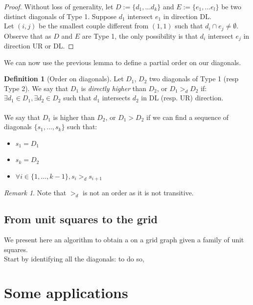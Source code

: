\documentclass[12pt]{article}
\theoremstyle{definition}
\newtheorem{definition}{Definition}[section]
\theoremstyle{remark}
\newtheorem*{remark}{Remark}
\begin{document}
\begin{proof}
    Without loss of generality, let $D:=\{d_1, ... d_k\}$ and $E:= \{e_1, ... e_l\}$ be two distinct diagonals of Type 1. 
    Suppose $d_1$ intersect $e_1$ in direction DL. \\
    Let $(i,j)$ be the smallest couple different from $(1,1)$ such that $d_i \cap e_j \ne \emptyset$. Observe that as $D$ and $E$ are Type 1, the only possibility is that 
    $d_i$ intersect $e_j$ in direction UR or DL.
\end{proof}

We can now use the previous lemma to define a partial order on our diagonals.

\begin{definition}[Order on diagonals]
    Let $D_1$, $D_2$ two diagonals of Type 1 (resp Type 2). We say that $D_1$ is \textit{directly higher} than $D_2$, or $D_1 >_d D_2$ if:
    $\exists d_1 \in D_1, \exists d_2 \in D_2$ such that $d_1$ intersects $d_2$ in DL (resp. UR) direction. \\ \\
    We say that $D_1$ is higher than $D_2$, or $D_1 > D_2$ if we can find a sequence of diagonals $\{s_1, ... , s_k\}$ such that:
    \begin{itemize}
        \item $s_1 = D_1$
        \item $s_k = D_2$
        \item $\forall i \in \{1, ..., k-1\}, s_i >_d s_{i+1}$
    \end{itemize} 
\end{definition}


\begin{remark}
    Note that $>_d$ is not an order as it is not transitive. 
\end{remark}


\subsection{From unit squares to the grid}

We present here an algorithm to obtain a on a grid graph given a family of unit squares.\\
Start by identifying all the diagonals: to do so,

\section{Some applications}
\end{document}
